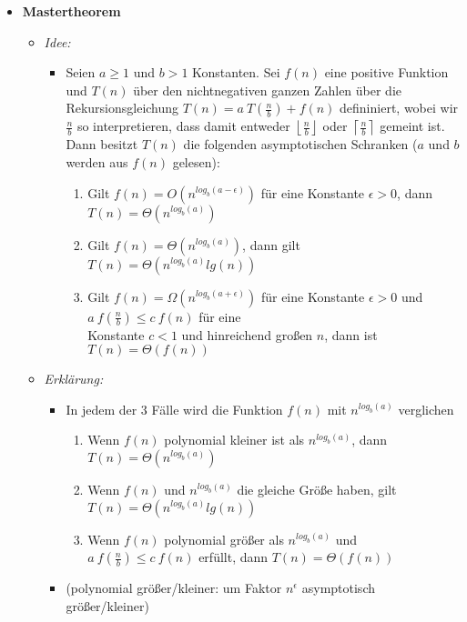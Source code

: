 \begin{itemize}
        \item \textbf{Mastertheorem}
            \begin{itemize}
                \item \textit{Idee:}
                    \begin{itemize}
                        \item[] 
                            Seien $a \geq 1$ und $b > 1$ Konstanten. Sei $f(n)$ eine positive Funktion und $T(n)$ 
                            über den nichtnegativen ganzen Zahlen über die Rekursionsgleichung $T(n) = a~T(\frac{n}{b}) + f(n)$
                            defininiert, wobei wir $\frac{n}{b}$ so interpretieren, dass damit entweder $\left \lfloor \frac{n}{b} \right \rfloor$
                            oder $\left \lceil \frac{n}{b} \right \rceil$ gemeint ist. Dann besitzt $T(n)$ die folgenden asymptotischen Schranken
                            ($a$ und $b$ werden aus $f(n)$ gelesen):
                            \begin{enumerate}
                                \item Gilt $f(n) = O(n^{log_b (a - \epsilon)})$ für eine Konstante $\epsilon > 0$, dann $T(n) = \Theta(n^{log_b (a)})$
                                \item Gilt $f(n) = \Theta(n^{log_b (a)})$, dann gilt $T(n) = \Theta(n^{log_b (a)} lg(n))$
                                \item Gilt $f(n) = \Omega(n^{log_b (a+\epsilon)})$ für eine Konstante $\epsilon > 0$ und $a~f(\frac{n}{b}) \leq c~f(n)$
                                      für eine \\ Konstante $c < 1$ und hinreichend großen $n$, dann ist $T(n) = \Theta(f(n))$
                            \end{enumerate}
                    \end{itemize}
                
                \item \textit{Erklärung:}
                    \begin{itemize}
                        \item In jedem der 3 Fälle wird die Funktion $f(n)$ mit $n^{log_b(a)}$ verglichen
                            \begin{enumerate}
                                \item Wenn $f(n)$ polynomial kleiner ist als $n^{log_b(a)}$, dann $T(n) = \Theta(n^{log_b(a)})$
                                \item Wenn $f(n)$ und $n^{log_b(a)}$ die gleiche Größe haben, gilt $T(n) = \Theta(n^{log_b (a)} lg(n))$
                                \item Wenn $f(n)$ polynomial größer als $n^{log_b(a)}$ und $a~f(\frac{n}{b}) \leq c~f(n)$ erfüllt, dann $T(n) = \Theta(f(n))$
                            \end{enumerate}
                        \item (polynomial größer/kleiner: um Faktor $n^\epsilon$ asymptotisch größer/kleiner)
                    \end{itemize}


\end{itemize}
\end{itemize}
